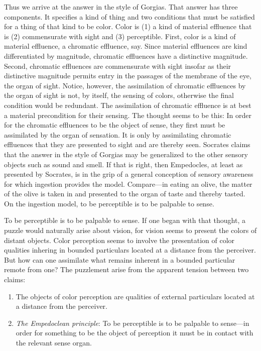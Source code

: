 \documentclass[12pt]{article}
\begin{document}
Thus we arrive at the answer in the style of Gorgias. That answer has three components. It specifies a kind of thing and two conditions that must be satisfied for a thing of that kind to be color. Color is (1) a kind of material effluence that is (2) commensurate with sight and (3) perceptible. First, color is a kind of material effluence, a chromatic effluence, say. Since material effluences are kind differentiated by magnitude, chromatic effluences have a distinctive magnitude. Second, chromatic effluences are commensurate with sight insofar as their distinctive magnitude permits entry in the passages of the membrane of the eye, the organ of sight. Notice, however, the assimilation of chromatic effluences by the organ of sight is not, by itself, the sensing of colors, otherwise the final condition would be redundant. The assimilation of chromatic effluence is at best a material precondition for their sensing. The thought seems to be this: In order for the chromatic effluences to be the object of sense, they first must be assimilated by the organ of sensation. It is only by assimilating chromatic effluences that they are presented to sight and are thereby seen. Socrates claims that the answer in the style of Gorgias may be generalized to the other sensory objects such as sound and smell. If that is right, then Empedocles, at least as presented by Socrates, is in the grip of a general conception of sensory awareness for which ingestion provides the model. Compare---in eating an olive, the matter of the olive is taken in and presented to the organ of taste and thereby tasted. On the ingestion model, to be perceptible is to be palpable to sense.

To be perceptible is to be palpable to sense. If one began with that thought, a puzzle would naturally arise about vision, for vision seems to present the colors of distant objects. Color perception seems to involve the presentation of color qualities inhering in bounded particulars located at a distance from the perceiver. But how can one assimilate what remains inherent in a bounded particular remote from one? The puzzlement arise from the apparent tension between two claims:
\begin{enumerate}[(1)]
    \item The objects of color perception are qualities of external particulars located at a distance from the perceiver.
    \item \emph{The Empedoclean principle}: To be perceptible is to be palpable to sense---in order for something to be the object of perception it must be in contact with the relevant sense organ.
\end{enumerate}
\end{document}
